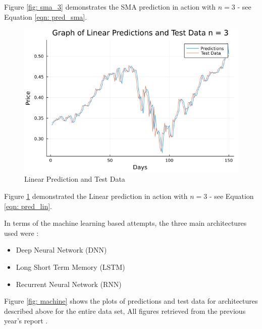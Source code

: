 \noindent Figure \ref{fig: sma_3} demonstrates the SMA prediction in action with $n = 3$ - see Equation \ref{eqn: pred_sma}.

\begin{figure}[h]
    \centering
    \includegraphics[width=0.8\columnwidth]{Results/lin_3.png}
    \caption{Linear Prediction and Test Data}
    \label{fig: lin_3}
\end{figure}

\noindent Figure \ref{fig: lin_3} demonstrated the Linear prediction in action with $n = 3$ - see Equation \ref{eqn: pred_lin}. 

\noindent In terms of the machine learning based attempts, the three main architectures used were \cite{ml_paper}:

\begin{itemize}
    \item Deep Neural Network (DNN)
    \item Long Short Term Memory (LSTM)
    \item Recurrent Neural Network (RNN)
\end{itemize}

\noindent Figure \ref{fig: machine} shows the plots of predictions and test data for architectures described above for the entire data set, All figures retrieved from the previous year's report \cite{ml_paper}. 

